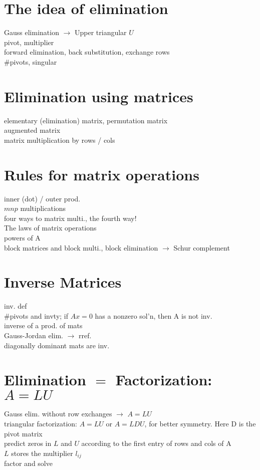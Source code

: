 \documentclass{report}
\begin{document}
\section{The idea of elimination}
Gauss elimination $\rightarrow$ Upper triangular $U$ \\
pivot, multiplier \\
forward elimination, back substitution, exchange rows \\
\#pivots, singular 

\section{Elimination using matrices}
elementary (elimination) matrix, permutation matrix \\
augmented matrix \\
matrix multiplication by rows / cols \\

\section{Rules for matrix operations}
inner (dot) / outer prod. \\
$mnp$ multiplications \\
four ways to matrix multi., the fourth way! \\
The laws of matrix operations \\
powers of A \\
block matrices and block multi., block elimination $\rightarrow$ Schur complement \\

\section{Inverse Matrices}
inv. def \\
\#pivots and invty; if $Ax = 0$ has a nonzero sol'n, then A is not inv. \\
inverse of a prod. of mats  \\
Gauss-Jordan elim. $\rightarrow$ rref. \\
diagonally dominant mats are inv. \\

\section{Elimination $=$ Factorization: $A = LU$}
Gauss elim. without row exchanges $\rightarrow$ $A = LU$ \\
triangular factorization: $A = LU$ or $A = LDU$, for better symmetry. Here D is the pivot matrix \\
predict zeros in $L$ and $U$ according to the first entry of rows and cols of A \\
$L$ stores the multiplier $l_{ij}$ \\
factor and solve 
\end{document}

